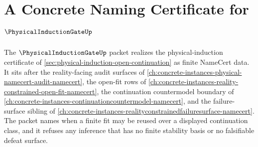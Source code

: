 \chapter{A Concrete Naming Certificate for $\PhysicalInductionGateUp$}
\label{ch:concrete-instances-physical-induction-gate-namecert}

The $\PhysicalInductionGateUp$ packet realizes the physical-induction certificate of \autoref{sec:physical-induction-open-continuation} as finite NameCert data. It sits after the reality-facing audit surfaces of \autoref{ch:concrete-instances-physical-namecert-audit-namecert}, the open-fit rows of \autoref{ch:concrete-instances-reality-constrained-open-fit-namecert}, the continuation countermodel boundary of \autoref{ch:concrete-instances-continuationcountermodel-namecert}, and the failure-surface sibling of \autoref{ch:concrete-instances-realityconstrainedfailuresurface-namecert}. The packet names when a finite fit may be reused over a displayed continuation class, and it refuses any inference that has no finite stability basis or no falsifiable defeat surface.

